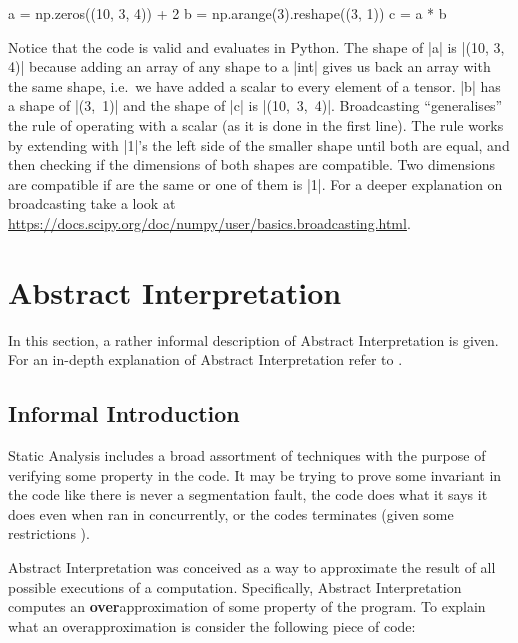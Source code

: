 \begin{pythoncode}
a = np.zeros((10, 3, 4)) + 2
b = np.arange(3).reshape((3, 1))
c = a * b
\end{pythoncode}

Notice that the code is valid and evaluates in Python. The shape of
\pycode|a| is \pycode|(10, 3, 4)| because adding an array of any shape
to a \pycode|int| gives us back an array with the same shape, i.e.~we
have added a scalar to every element of a tensor. \pycode|b| has a shape
of \pycode|(3,\ 1)| and the shape of \pycode|c| is
\pycode|(10,\ 3,\ 4)|. Broadcasting \enquote{generalises} the rule of
operating with a scalar (as it is done in the first line). The rule
works by extending with \pycode|1|'s the left side of the smaller shape
until both are equal, and then checking if the dimensions of both shapes
are compatible. Two dimensions are compatible if are the same or one of
them is \pycode|1|. For a deeper explanation on broadcasting take a look
at \url{https://docs.scipy.org/doc/numpy/user/basics.broadcasting.html}.

\section{Abstract Interpretation}\label{abstract-interpretation}

In this section, a rather informal description of Abstract
Interpretation is given. For an in-depth explanation of Abstract
Interpretation refer to \autocites[Chapters 1 and
4]{nielson2015principles}{cousot_abstract_1977}{nipkow_abstract_2014}.

\subsection{Informal Introduction}\label{informal-introduction}

Static Analysis includes a broad assortment of techniques with the
purpose of verifying some property in the code. It may be trying to
prove some invariant in the code like there is never a segmentation
fault, the code does what it says it does even when ran in concurrently,
or the codes terminates (given some restrictions
\autocite{urban_static_2015}).

Abstract Interpretation was conceived \autocite{cousot_abstract_1977} as
a way to approximate the result of all possible executions of a
computation. Specifically, Abstract Interpretation computes an
\textbf{over}approximation of some property of the program. To explain
what an overapproximation is consider the following piece of code:

